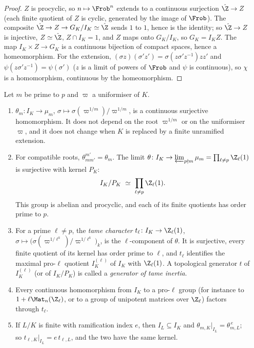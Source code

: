 \begin{proof}
$Z$ is procyclic, so $n\mapsto\Frob^n$ extends to a continuous surjection $\hat\Z\to Z$ (each finite quotient of $Z$ is cyclic, generated by the
image of $\Frob$). The composite $\hat\Z\to Z\to G_K/I_K\simeq\hat\Z$ sends $1$ to $1$, hence is the identity; so $\hat\Z\to Z$ is injective, $Z\simeq\hat\Z$,
$Z\cap I_K=1$, and $Z$ maps onto $G_K/I_K$, so $G_K=I_KZ$. The map $I_K\times Z\to G_K$ is a continuous bijection of compact spaces, hence a homeomorphism.
For the extension, $(\sigma z)(\sigma'z')=\sigma(z\sigma'z^{-1})zz'$ and $\psi(z\sigma'z^{-1})=\psi(\sigma')$ ($z$ is a limit of powers of $\Frob$ and $\psi$ is continuous), so
$\chi$ is a homomorphism, continuous by the homeomorphism.
\end{proof}

\begin{theorem}\label{thm:local:tame-character}
Let $m$ be prime to $p$ and $\varpi$ a uniformiser of $K$.
\begin{enumerate}[label=(\roman*)]
\item $\theta_m\colon I_K\to\mu_m$, $\sigma\mapsto\sigma(\varpi^{1/m})/\varpi^{1/m}$, is a continuous surjective homomorphism. It does not depend on the root
$\varpi^{1/m}$ or on the uniformiser $\varpi$, and it does not change when $K$ is replaced by a finite unramified extension.
\item For compatible roots, $\theta_{mm'}^{m'}=\theta_m$. The limit $\theta\colon I_K\to\varprojlim_{p\nmid m}\mu_m=\prod_{\ell\ne p}\Z_\ell(1)$ is surjective with kernel
$P_K$:
\[
I_K/P_K\ \simeq\ \prod_{\ell\ne p}\Z_\ell(1).
\]
This group is abelian and procyclic, and each of its finite quotients has order prime to $p$.
\item For a prime $\ell\ne p$, the \emph{tame character} $t_\ell\colon I_K\to\Z_\ell(1)$, $\sigma\mapsto\bigl(\sigma(\varpi^{1/\ell^k})/\varpi^{1/\ell^k}\bigr)_k$, is the
$\ell$-component of $\theta$. It is surjective, every finite quotient of its kernel has order prime to $\ell$, and $t_\ell$ identifies the
maximal pro-$\ell$ quotient $I_K^{(\ell)}$ of $I_K$ with $\Z_\ell(1)$. A topological generator $t$ of $I_K^{(\ell)}$ (or of $I_K/P_K$) is called a
\emph{generator of tame inertia}.
\item Every continuous homomorphism from $I_K$ to a pro-$\ell$ group (for instance to $1+\ell\Mat_n(\Z_\ell)$, or to a group of unipotent matrices
over $\Z_\ell$) factors through $t_\ell$.
\item If $L/K$ is finite with ramification index $e$, then $I_L\subseteq I_K$ and $\theta_{m,K}|_{I_L}=\theta_{m,L}^{\,e}$; so $t_{\ell,K}|_{I_L}=e\,t_{\ell,L}$, and the two
have the same kernel.
\end{enumerate}
\end{theorem}

